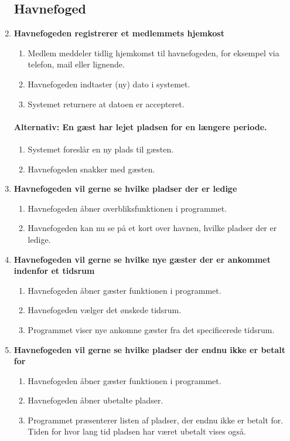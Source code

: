 \begin{enumerate}
\subsection{Havnefoged}
    \item{\bf{Havnefogeden registrerer et medlemmets hjemkost}}
      \begin{enumerate}
        \item Medlem meddeler tidlig hjemkomst til havnefogeden, for eksempel via telefon, mail eller lignende.
        \item Havnefogeden indtaster (ny) dato i systemet.
        \item Systemet returnere at datoen er accepteret.
      \end{enumerate}
  
    \paragraph{Alternativ: En gæst har lejet pladsen for en længere periode.}
      \begin{enumerate}
        \item Systemet foreslår en ny plads til gæsten.
        \item Havnefogeden snakker med gæsten.
      \end{enumerate}

    \item{\bf{Havnefogeden vil gerne se hvilke pladser der er ledige}}
      \begin{enumerate}
        \item Havnefogeden åbner overbliksfunktionen i programmet.
        \item Havnefogeden kan nu se på et kort over havnen, hvilke pladser der er ledige.
      \end{enumerate}

    \item{\bf{Havnefogeden vil gerne se hvilke nye gæster der er ankommet indenfor et tidsrum}}
      \begin{enumerate}
        \item Havnefogeden åbner gæster funktionen i programmet.
        \item Havnefogeden vælger det ønskede tidsrum.
        \item Programmet viser nye ankomne gæster fra det specificerede tidsrum.
      \end{enumerate}

    \item{\bf{Havnefogeden vil gerne se hvilke pladser der endnu ikke er betalt for}}
      \begin{enumerate}
        \item Havnefogeden åbner gæster funktionen i programmet.
        \item Havnefogeden åbner ubetalte pladser.
        \item Programmet præsenterer listen af pladser, der endnu ikke er betalt for. Tiden for hvor lang tid pladsen har været ubetalt vises også.
      \end{enumerate}


\end{enumerate}
